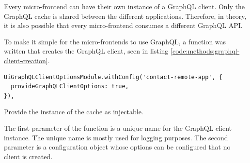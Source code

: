 \fi

Every micro-frontend can have their own instance of a GraphQL client. Only the GraphQL cache is shared between the different applications. Therefore, in theory, it is also possible that every micro-frontend consumes a different GraphQL API. 

\ifshowUnusedContent
\fi

To make it simple for the micro-frontends to use GraphQL, a function was written that creates the GraphQL client, seen in listing \ref{code:methods:graphql-client-creation}.

\ifshowListings
\begin{listing}[H]
\begin{verbatim}
UiGraphQLClientOptionsModule.withConfig('contact-remote-app', { 
  provideGraphQLClientOptions: true,
}),
\end{verbatim}
\caption{Provide the instance of the cache as injectable.}\label{code:methods:graphql-client-creation}
\end{listing}
\fi

The first parameter of the function is a unique name for the GraphQL client instance. The unique name is mostly used for logging purposes. The second parameter is a configuration object whose options can be configured that no client is created.  

\ifshowUnusedContent
\fi

